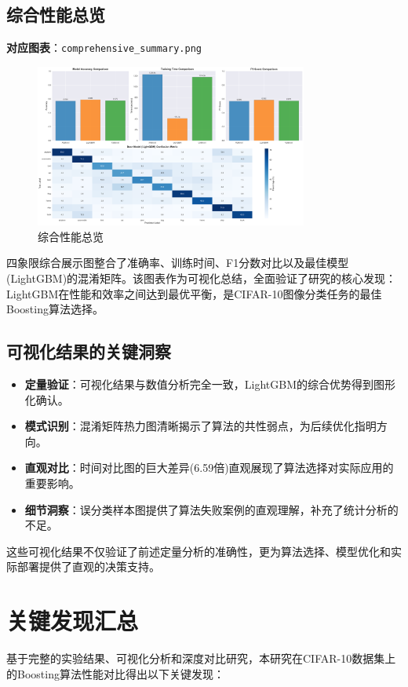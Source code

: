\documentclass[UTF8]{report}
\theoremstyle{MyLineTheoremStyle} %
\theoremstyle{MyBlockTheoremStyle} %
\theoremstyle{MySubsubsectionStyle} %
\begin{document}
\subsection{综合性能总览}
\textbf{对应图表}：\texttt{comprehensive\_summary.png}
\begin{figure}[H]
    \centering
    \includegraphics[width=0.8\textwidth]{comprehensive_summary.png}
    \caption{综合性能总览}
\end{figure}
四象限综合展示图整合了准确率、训练时间、F1分数对比以及最佳模型(LightGBM)的混淆矩阵。该图表作为可视化总结，全面验证了研究的核心发现：LightGBM在性能和效率之间达到最优平衡，是CIFAR-10图像分类任务的最佳Boosting算法选择。

\subsection{可视化结果的关键洞察}
\begin{itemize}
    \item \textbf{定量验证}：可视化结果与数值分析完全一致，LightGBM的综合优势得到图形化确认。
    \item \textbf{模式识别}：混淆矩阵热力图清晰揭示了算法的共性弱点，为后续优化指明方向。
    \item \textbf{直观对比}：时间对比图的巨大差异(6.59倍)直观展现了算法选择对实际应用的重要影响。
    \item \textbf{细节洞察}：误分类样本图提供了算法失败案例的直观理解，补充了统计分析的不足。
\end{itemize}
这些可视化结果不仅验证了前述定量分析的准确性，更为算法选择、模型优化和实际部署提供了直观的决策支持。

\section{关键发现汇总}
基于完整的实验结果、可视化分析和深度对比研究，本研究在CIFAR-10数据集上的Boosting算法性能对比得出以下关键发现：
\end{document}
